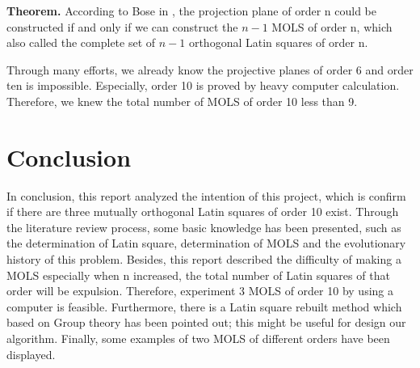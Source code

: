 \documentclass[12pt]{article}
\begin{document}
\textbf{Theorem.} According to Bose in \cite{ref15}, the projection plane of order n could be constructed if and only if we can construct the $n-1$ MOLS of order n, which also called the complete set of $n-1$ orthogonal Latin squares of order n.


Through many efforts, we already know the projective planes of order 6 and order ten is impossible. Especially, order 10 is proved by heavy computer calculation. Therefore, we knew the total number of MOLS of order 10 less than 9.

\section{Conclusion}

In conclusion, this report analyzed the intention of this project, which is confirm if there are three mutually orthogonal Latin squares of order 10 exist. Through the literature review process, some basic knowledge has been presented, such as the determination of Latin square, determination of MOLS and the evolutionary history of this problem. Besides, this report described the difficulty of making a MOLS especially when n increased, the total number of Latin squares of that order will be expulsion. Therefore, experiment 3 MOLS of order 10 by using a computer is feasible. Furthermore, there is a Latin square rebuilt method which based on Group theory has been pointed out; this might be useful for design our algorithm. Finally, some examples of two MOLS of different orders have been displayed.
\end{document}
